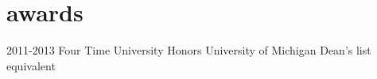 \section{awards}

\begin{entrylist}
\entry
{2011-2013}
{Four Time University Honors}
{University of Michigan}
{Dean's list equivalent}
\end{entrylist}
